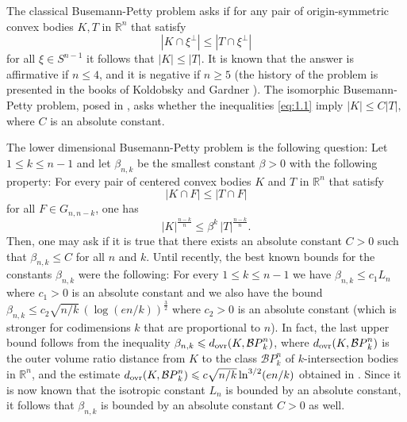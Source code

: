 \documentclass[11pt,leqno]{article}
\theoremstyle{definition}
\theoremstyle{remark}
\numberwithin{equation}{section}
\newcommand{\ls}{\leqslant}
\newcommand{\gr}{\geqslant}
\newcommand{\1}{\textbf{1}}
\newcommand{\R}{\mathbb{R}}
\begin{document}
The classical Busemann-Petty problem \cite{Busemann-Petty-1956} asks if for any pair of origin-symmetric convex bodies $K,T$ in $\R^n$ that satisfy
\begin{equation}\label{eq:1.1}
|K\cap\xi^\perp | \ls |T\cap\xi^\perp|\end{equation}
for all $\xi\in S^{n-1}$ it follows that $|K| \ls |T|$. It is known that the answer is affirmative if $n\ls 4$, and it is negative if $n\gr 5$ (the history of the problem is presented in the books of Koldobsky \cite{Koldobsky-book} and Gardner \cite{Gardner-book}).
The isomorphic Busemann-Petty problem, posed in \cite{VMilman-Pajor-1989}, asks whether the inequalities \eqref{eq:1.1} imply $\left|K\right| \ls C\left|T\right|,$ where $C$ is an absolute constant.

The lower dimensional Busemann-Petty problem is the following question: Let $1\ls k\ls n-1$ and let $\beta_{n,k}$ be the smallest constant $\beta >0$ with the following property: For every pair of centered convex bodies $K$ and $T$ in ${\mathbb R}^n$ that satisfy
\begin{equation}\label{eq:1.6}|K\cap F|\ls |T\cap F|\end{equation}
for all $F\in G_{n,n-k}$, one has
\begin{equation}\label{eq:1.7}|K|^{\frac{n-k}{n}}\ls \beta^k\,|T|^{\frac{n-k}{n}}.\end{equation}
Then, one may ask if it is true that there exists an absolute constant $C>0$ such that $\beta_{n,k}\ls C$ for all $n$ and $k$.
Until recently, the best known bounds for the constants $\beta_{n,k}$ were the following: For every $1\ls k\ls n-1$ we have
$\beta_{n,k}\ls c_1L_n$ where $c_1>0$ is an absolute constant and we also have the bound $\beta_{n,k}\ls c_2\sqrt{n/k}\,(\log (en/k))^{\frac{3}{2}}$ where $c_2>0$ is an absolute constant (which is stronger for codimensions $k$ that are
proportional to $n$). In fact, the last upper bound follows from the inequality $\beta_{n,k}\ls d_{{\rm {ovr}}}(K,{\mathcal BP}_k^n)$,
where $d_{{\rm {ovr}}}(K,{\mathcal BP}_k^n)$ is the outer volume ratio distance from $K$ to the class ${\mathcal BP}_k^n$ of $k$-intersection bodies in ${\mathbb R}^n$, and the estimate $d_{{\rm {ovr}}}(K,{\mathcal BP}_k^n)\ls c\sqrt{n/k}\ln^{3/2}(en/k)$ obtained in \cite{Koldobsky-Paouris-Zymonopoulou-2011}. Since it is now known that the isotropic constant $L_n$ is bounded by an absolute constant, it follows that $\beta_{n,k}$ is bounded by an absolute constant $C>0$ as well.
\end{document}
